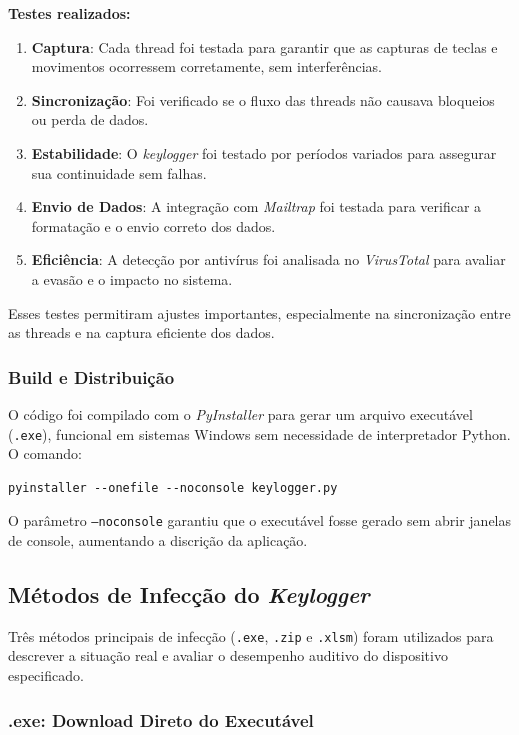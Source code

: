 \documentclass[12pt]{article}
\begin{document}
\textbf{Testes realizados:}

\begin{enumerate}
    \item \textbf{Captura}: Cada thread foi testada para garantir que as capturas de teclas e movimentos ocorressem corretamente, sem interferências.
    \item \textbf{Sincronização}: Foi verificado se o fluxo das threads não causava bloqueios ou perda de dados.
    \item \textbf{Estabilidade}: O \textit{keylogger} foi testado por períodos variados para assegurar sua continuidade sem falhas.
    \item \textbf{Envio de Dados}: A integração com \textit{Mailtrap} foi testada para verificar a formatação e o envio correto dos dados.
    \item \textbf{Eficiência}: A detecção por antivírus foi analisada no \textit{VirusTotal} para avaliar a evasão e o impacto no sistema.
\end{enumerate}

Esses testes permitiram ajustes importantes, especialmente na sincronização entre as threads e na captura eficiente dos dados.
\subsubsection{Build e Distribuição}

O código foi compilado com o \textit{PyInstaller} para gerar um arquivo executável (\texttt{.exe}), funcional em sistemas Windows sem necessidade de interpretador Python. O comando:

\begin{verbatim} 
pyinstaller --onefile --noconsole keylogger.py 
\end{verbatim}

O parâmetro \texttt{--noconsole} garantiu que o executável fosse gerado sem abrir janelas de console, aumentando a discrição da aplicação.

\subsection{Métodos de Infecção do \textit{Keylogger}}
Três métodos principais de infecção (\texttt{.exe}, \texttt{.zip} e \texttt{.xlsm}) foram utilizados para descrever a situação real e avaliar o desempenho auditivo do dispositivo especificado.

\subsubsection{.exe: Download Direto do Executável}
\end{document}
